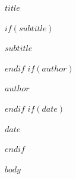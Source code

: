 \documentclass[11pt,letterpaper,openany,oneside]{memoir}
\begin{document}
\pagecolor{pagecolor}
\color{textcolor}

\begin{titlingpage}
\vspace*{3cm}
\begin{center}
{\fontsize{36}{42}\selectfont\bfseries\color{titlecolor} $title$\par}
\vspace{1cm}
$if(subtitle)$
{\Large\color{datecolor} $subtitle$\par}
\vspace{1.5cm}
$endif$
$if(author)$
{\large\color{textcolor} $author$\par}
$endif$
$if(date)$
\vspace{0.5cm}
{\normalsize\color{datecolor} $date$\par}
$endif$
\end{center}
\end{titlingpage}

\frontmatter
\tableofcontents*
\clearpage

\mainmatter
$body$
\end{document}
